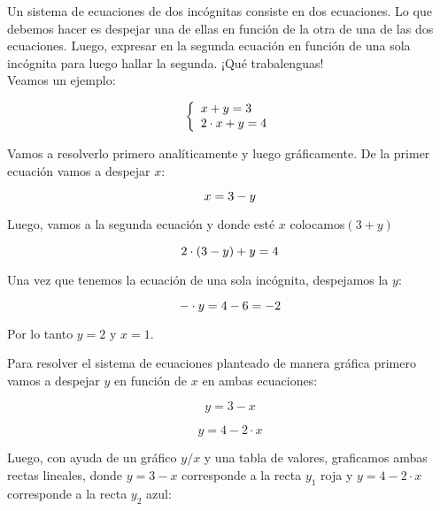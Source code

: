 Un sistema de ecuaciones de dos incógnitas consiste en dos ecuaciones. Lo que debemos hacer es despejar una de ellas en función de la otra de una de las dos ecuaciones. Luego, expresar en la segunda ecuación en función de una sola incógnita para luego hallar la segunda. ¡Qué trabalenguas! \\

Veamos un ejemplo:

\begin{equation}
    \notag
     \left\{ \begin{array}{lcc}
             x + y =3 
             \\2\cdot x + y = 4
             \end{array}
   \right.
\end{equation}

Vamos a resolverlo primero analíticamente y luego gráficamente. De la primer ecuación vamos a despejar $x$:

\begin{equation}
    \notag
    x = 3 - y
\end{equation}

Luego, vamos a la segunda ecuación y donde esté $x$ colocamos$(3+y)$

\begin{equation}
    \notag
    2\cdot  ( 3 - y ) +y =4
\end{equation}

Una vez que tenemos la ecuación de una sola incógnita, despejamos la $y$:

\begin{equation}
    \notag
    -\cdot y = 4- 6 =-2
\end{equation}

Por lo tanto $y=2$ y $x=1$.\\
\medskip

Para resolver el sistema de ecuaciones planteado de manera gráfica primero vamos a despejar $y$ en función de $x$ en ambas ecuaciones:

\begin{equation}
     y = 3-x
\end{equation}

\begin{equation}
     y = 4-2\cdot x
\end{equation}

Luego, con ayuda de un gráfico $y/x$ y una tabla de valores, graficamos ambas rectas lineales, donde $y = 3-x$ corresponde a la recta $y_1$ roja y $y = 4-2\cdot x$ corresponde a la recta $y_2$ azul:

